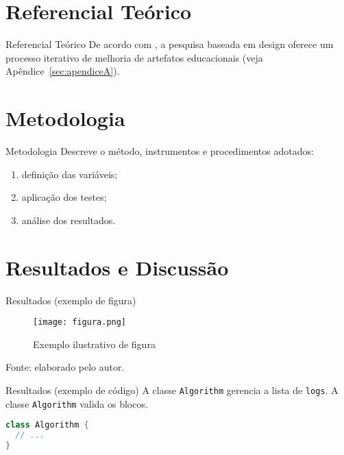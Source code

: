 \documentclass[aspectratio=169]{beamer}
\newcommand{\code}[1]{\texttt{#1}}
\begin{document}
\section{Referencial Teórico}

\begin{frame}{Referencial Teórico}
De acordo com \parencite{pimentelDesignScienceResearch2020}, a pesquisa baseada em
design oferece um processo iterativo de melhoria de artefatos educacionais
(veja Apêndice~\ref{sec:apendiceA}).
\end{frame}

\section{Metodologia}

\begin{frame}{Metodologia}
Descreve o método, instrumentos e procedimentos adotados:

\begin{enumerate}[label=\alph*), itemsep=2pt]
  \item definição das variáveis;
  \item aplicação dos testes;
  \item análise dos resultados.
\end{enumerate}
\end{frame}

\section{Resultados e Discussão}

\begin{frame}{Resultados (exemplo de figura)}
\begin{figure}
  \texttt{[image: figura.png]}
  \caption{Exemplo ilustrativo de figura}
\end{figure}
{\tiny Fonte: elaborado pelo autor.}
\end{frame}

\begin{frame}[fragile]{Resultados (exemplo de código)}
A classe \code{Algorithm} gerencia a lista de \code{logs}.  
A classe \lstinline!Algorithm! valida os blocos.
\begin{lstlisting}[language=Java, caption={Exemplo de classe}, label={lst:ex}]
class Algorithm {
  // ...
}
\end{lstlisting}
\end{frame}
\end{document}

